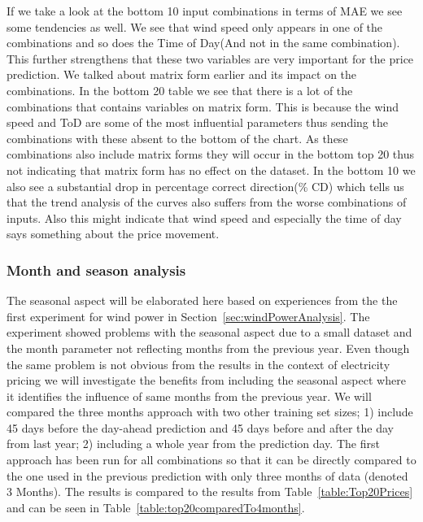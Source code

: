 If we take a look at the bottom 10 input combinations in terms of MAE we see some tendencies as well. We see that wind speed only appears in one of the combinations and so does the Time of Day(And not in the same combination). This further strengthens that these two variables are very important for the price prediction. We talked about matrix form earlier and its impact on the combinations. In the bottom 20 table we see that there is a lot of the combinations that contains variables on matrix form. This is because the wind speed and ToD are some of the most influential parameters thus sending the combinations with these absent to the bottom of the chart. As these combinations also include matrix forms they will occur in the bottom top 20 thus not indicating that matrix form has no effect on the dataset. In the bottom 10 we also see a substantial drop in percentage correct direction(\% CD) which tells us that the trend analysis of the curves also suffers from the worse combinations of inputs. Also this might indicate that wind speed and especially the time of day says something about the price movement.

\subsubsection{Month and season analysis}
The seasonal aspect will be elaborated here based on experiences from the the first experiment for wind power in Section~\ref{sec:windPowerAnalysis}. The experiment showed problems with the seasonal aspect due to a small dataset and the month parameter not reflecting months from the previous year. Even though the same problem is not obvious from the results in the context of electricity pricing we will investigate the benefits from including the seasonal aspect where it identifies the influence of same months from the previous year. We will compared the three months approach with two other training set sizes; 1) include 45 days before the day-ahead prediction and 45 days before and after the day from last year; 2) including a whole year from the prediction day. The first approach has been run for all combinations so that it can be directly compared to the one used in the previous prediction with only three months of data (denoted 3 Months). The results is compared to the results from Table~\ref{table:Top20Prices} and can be seen in Table~\ref{table:top20comparedTo4months}. 

